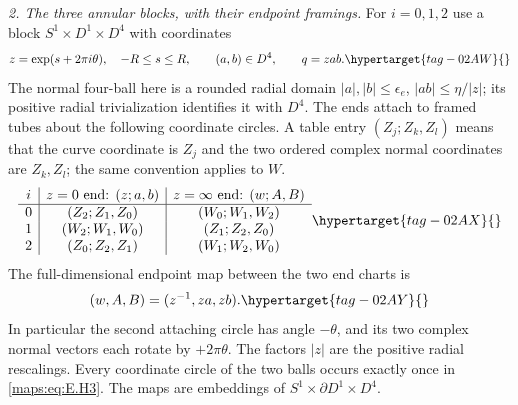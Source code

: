 \begin{theorem}
\emph{2. The three annular blocks, with their endpoint framings.}
For $i=0,1,2$ use a block $S^1\times D^1\times D^4$ with coordinates
\begin{equation}
 z=\exp(s+2\pi i\theta),\quad -R\leq s\leq R,
 \qquad (a,b)\in D^4,\qquad q=zab.
 \hypertarget{tag-02AW}{}\label{maps:eq:E.H2}
\end{equation}
The normal four-ball here is a rounded radial domain
$|a|,|b|\leq\epsilon_e$, $|ab|\leq\eta/|z|$;
its positive radial trivialization identifies it with $D^4$.
The ends attach to framed tubes about the following coordinate
circles.  A table entry $(Z_j;Z_k,Z_l)$ means that the curve
coordinate is $Z_j$ and the two ordered complex normal coordinates
are $Z_k,Z_l$; the same convention applies to $W$.
\begin{equation}
\begin{array}{c|c|c}
 i&z=0\hbox{ end: }(z;a,b)&z=\infty\hbox{ end: }(w;A,B)\\ \hline
0&(Z_2;Z_1,Z_0)&(W_0;W_1,W_2)\\
1&(W_2;W_1,W_0)&(Z_1;Z_2,Z_0)\\
2&(Z_0;Z_2,Z_1)&(W_1;W_2,W_0)
\end{array}
\hypertarget{tag-02AX}{}\label{maps:eq:E.H3}
\end{equation}
The full-dimensional endpoint map between the two end charts is
\begin{equation}
                 (w,A,B)=(z^{-1},za,zb).
 \hypertarget{tag-02AY}{}\label{maps:eq:E.H4}
\end{equation}
In particular the second attaching circle has angle $-\theta$,
and its two complex normal vectors each rotate by $+2\pi\theta$.
The factors $|z|$ are the positive radial rescalings.
  Every coordinate circle
of the two balls occurs exactly once in \eqref{maps:eq:E.H3}.  The maps are
embeddings of $S^1\times\partial D^1\times D^4$.


\end{theorem}
